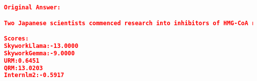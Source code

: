 \begin{lstlisting}[language=json,numbers=none]
Original Answer:

Two Japanese scientists commenced research into inhibitors of HMG-CoA reductase in 1971 reasoning that organisms might produce such products as the enzyme is important in some essential cell wall components. This work lead to the identification of the first clinically useful compound lovastatin(mevinolin)  from a mould in the mid 1970's. This agent was first used in the more severe forms of hypercholesteraemia in the 1980s followed by landmark trials  with simvastatin that showed the potential for cardio-prevention. Cerivastatin was withdrawn in 2001

Scores:
SkyworkLlama:-13.0000
SkyworkGemma:-9.0000
URM:0.6451
QRM:13.0203
Internlm2:-0.5917
\end{lstlisting}